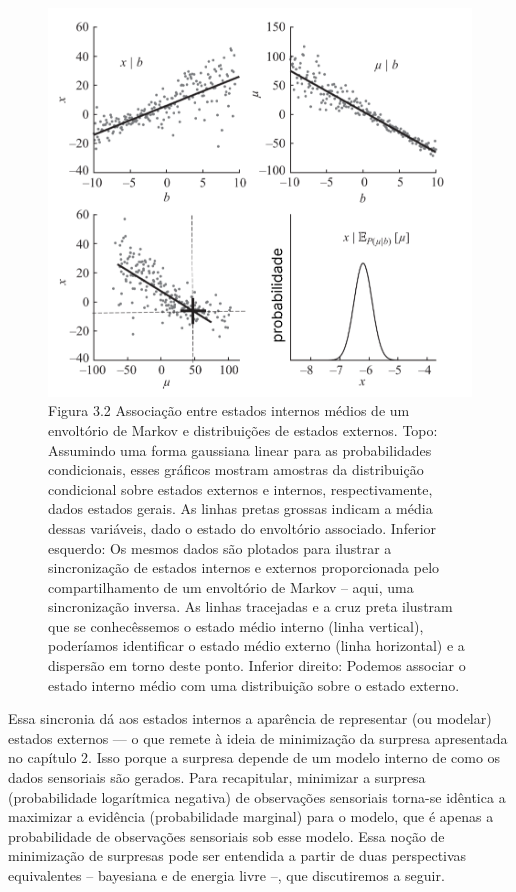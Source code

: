 \documentclass[
  12pt,
]{book}
\begin{document}
\begin{figure}
\centering
\includegraphics{images/Figura_3_2.png}
\caption{Figura 3.2 Associação entre estados internos médios de um envoltório de Markov e distribuições de estados externos. Topo: Assumindo uma forma gaussiana linear para as probabilidades condicionais, esses gráficos mostram amostras da distribuição condicional sobre estados externos e internos, respectivamente, dados estados gerais. As linhas pretas grossas indicam a média dessas variáveis, dado o estado do envoltório associado. Inferior esquerdo: Os mesmos dados são plotados para ilustrar a sincronização de estados internos e externos proporcionada pelo compartilhamento de um envoltório de Markov -- aqui, uma sincronização inversa. As linhas tracejadas e a cruz preta ilustram que se conhecêssemos o estado médio interno (linha vertical), poderíamos identificar o estado médio externo (linha horizontal) e a dispersão em torno deste ponto. Inferior direito: Podemos associar o estado interno médio com uma distribuição sobre o estado externo.}
\end{figure}

Essa sincronia dá aos estados internos a aparência de representar (ou modelar) estados externos --- o que remete à ideia de minimização da surpresa apresentada no capítulo 2. Isso porque a surpresa depende de um modelo interno de como os dados sensoriais são gerados. Para recapitular, minimizar a surpresa (probabilidade logarítmica negativa) de observações sensoriais torna-se idêntica a maximizar a evidência (probabilidade marginal) para o modelo, que é apenas a probabilidade de observações sensoriais sob esse modelo. Essa noção de minimização de surpresas pode ser entendida a partir de duas perspectivas equivalentes -- bayesiana e de energia livre --, que discutiremos a seguir.
\end{document}
